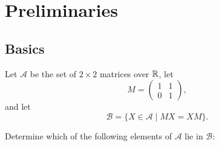 \chapter{Preliminaries}

\section{Basics}

Let $\mathcal{A}$ be the set of $2\times2$ matrices over $\mathbb{R}$, let
\begin{equation*}
  M = \begin{pmatrix}
    1 & 1 \\
    0 & 1
  \end{pmatrix},
\end{equation*}
and let
\begin{equation*}
  \mathcal{B} = \{X\in\mathcal{A}\mid MX = XM\}.
\end{equation*}


Determine which of the following elements of $\mathcal{A}$ lie in
$\mathcal{B}$:

